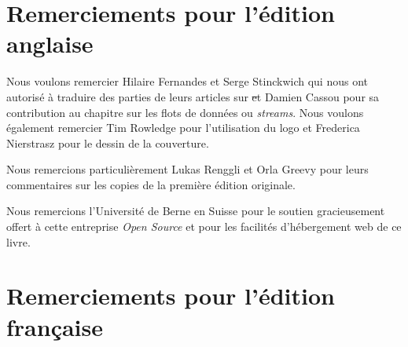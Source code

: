 \documentclass[a4paper,10pt,twoside]{book}
\begin{document}




\section*{Remerciements pour l'\'edition anglaise}


Nous voulons remercier Hilaire Fernandes et Serge Stinckwich qui nous
ont autoris\'e \`a traduire des parties de leurs articles sur \st et
Damien Cassou pour sa contribution au chapitre sur les flots de
donn\'ees ou \emph{streams}.
Nous voulons \'egalement remercier Tim Rowledge pour l'utilisation
du logo \sq et Frederica Nierstrasz pour le dessin de la couverture.

Nous remercions particuli\`erement Lukas Renggli et Orla Greevy pour leurs
commentaires sur les copies de la premi\`ere \'edition
originale.

Nous remercions l'Universit\'e de Berne en Suisse pour le soutien
gracieusement offert \`a cette entreprise \emph{Open Source} et pour
les facilit\'es d'h\'ebergement web de ce livre.

\section*{Remerciements pour l'\'edition fran\c{c}aise}
\end{document}
